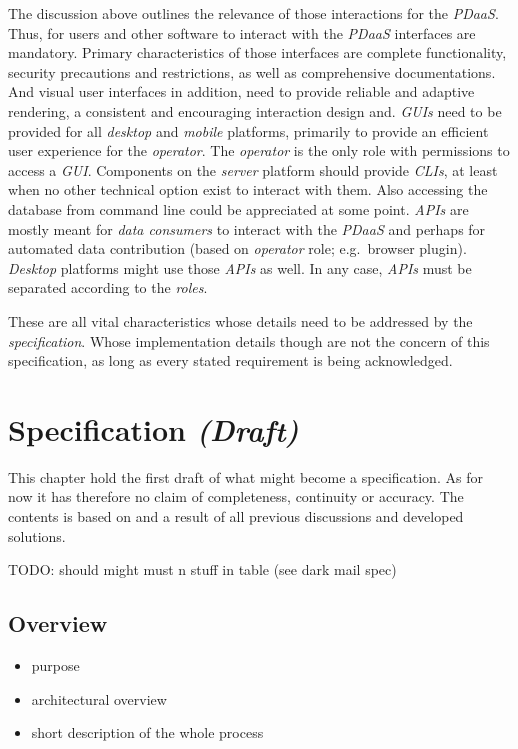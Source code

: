 \documentclass[12pt,english,a4paper,titlepage,cleardoublepage=empty,dottedtoc]{report}
\providecommand{\tightlist}{%
  \setlength{\itemsep}{0pt}\setlength{\parskip}{0pt}}
\begin{document}
The discussion above outlines the relevance of those interactions for
the \emph{PDaaS}. Thus, for users and other software to interact with
the \emph{PDaaS} interfaces are mandatory. Primary characteristics of
those interfaces are complete functionality, security precautions and
restrictions, as well as comprehensive documentations. And visual user
interfaces in addition, need to provide reliable and adaptive rendering,
a consistent and encouraging interaction design and. \emph{GUIs} need to
be provided for all \emph{desktop} and \emph{mobile} platforms,
primarily to provide an efficient user experience for the
\emph{operator}. The \emph{operator} is the only role with permissions
to access a \emph{GUI}. Components on the \emph{server} platform should
provide \emph{CLIs}, at least when no other technical option exist to
interact with them. Also accessing the database from command line could
be appreciated at some point. \emph{APIs} are mostly meant for
\emph{data consumers} to interact with the \emph{PDaaS} and perhaps for
automated data contribution (based on \emph{operator} role; e.g.~browser
plugin). \emph{Desktop} platforms might use those \emph{APIs} as well.
In any case, \emph{APIs} must be separated according to the
\emph{roles}.

These are all vital characteristics whose details need to be addressed
by the \emph{specification}. Whose implementation details though are not
the concern of this specification, as long as every stated requirement
is being acknowledged.

\chapter{\texorpdfstring{Specification
\emph{(Draft)}}{Specification (Draft)}}\label{specification-draft}

This chapter hold the first draft of what might become a specification.
As for now it has therefore no claim of completeness, continuity or
accuracy. The contents is based on and a result of all previous
discussions and developed solutions.

TODO: should might must n stuff in table (see dark mail spec)

\section{Overview}\label{overview}

\begin{itemize}
\tightlist
\item
  purpose
\item
  architectural overview
\item
  short description of the whole process
\end{itemize}
\end{document}
